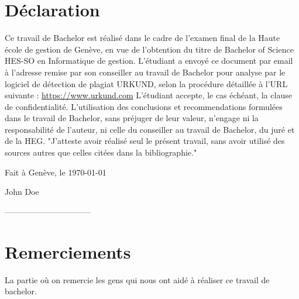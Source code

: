 \documentclass[12pt]{article}
\newcommand{\authorname}{John Doe}
\newcommand{\place}{Genève}
\begin{document}
\begin{titlepage}
\begin{center}
    \end{center}



    \vfill
\end{titlepage}




\newpage

\section{Déclaration}
Ce travail de Bachelor est réalisé dans le cadre de l'examen final de la Haute école de gestion de Genève, en vue de l'obtention du titre de Bachelor of Science HES-SO en Informatique de gestion.
\newline\newline
L'étudiant a envoyé ce document par email à l'adresse remise par son conseiller au travail de Bachelor pour analyse par le logiciel de détection de plagiat URKUND, selon la procédure détaillée à l'URL suivante : \url{https://www.urkund.com}
\newline\newline
L'étudiant accepte, le cas échéant, la clause de confidentialité.
L'utilisation des conclusions et recommendations formulées dans le travail de Bachelor, sans préjuger de leur valeur, n'engage ni la responsabilité de l'auteur, ni celle du conseiller au travail de Bachelor, du juré et de la HEG.
\newline\newline
"J'atteste avoir réalisé seul le présent travail, sans avoir utilisé des sources autres que celles citées dans la bibliographie."
\vspace{4cm}
\begin{flushright}
    Fait à \place, le \today
\end{flushright}

\begin{flushright}
    \authorname
\end{flushright}
\vspace{1cm}
\begin{flushright}
    --------------------------------
\end{flushright}


\newpage

\section{Remerciements}
La partie où on remercie les gens qui nous ont aidé à réaliser ce travail de bachelor.
\end{document}
